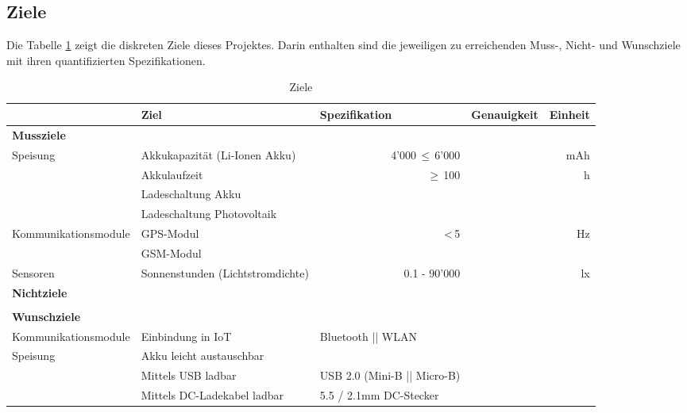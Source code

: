 \begin{landscape}
\subsection{Ziele}
Die Tabelle \ref{tab:ZieleP6} zeigt die diskreten Ziele dieses Projektes. Darin enthalten sind die jeweiligen zu erreichenden Muss-, Nicht- und Wunschziele mit ihren quantifizierten Spezifikationen.\\


\begin{table}[htbp]
  \centering
  \renewcommand{\arraystretch}{1.4}
  \caption{Ziele}
    \begin{tabular}{l|l|l|r|r}
          & \textbf{Ziel} & \multicolumn{1}{l|}{\textbf{Spezifikation}} & \multicolumn{1}{l|}{\textbf{Genauigkeit}} & \multicolumn{1}{l}{\textbf{Einheit}} \\
    \toprule
    \multicolumn{1}{l}{\textbf{Mussziele}} & \multicolumn{4}{r}{} \\
    \toprule
    \multirow{4}{*}{Speisung} & Akkukapazität (Li-Ionen Akku) & \multicolumn{1}{r|}{4'000\,$\leq$\,6'000} &  & mAh \\
\cline{2-5}           & Akkulaufzeit & \multicolumn{1}{r|}{$\geq$\,100} &   & h \\
\cline{2-5}          & Ladeschaltung Akku &       &       &  \\
\cline{2-5}           & Ladeschaltung Photovoltaik &       &       &  \\
    \hline
    \multirow{2}{*}{Kommunikationsmodule} & GPS-Modul   &  \multicolumn{1}{r|}{<\,5}  &       & Hz \\
\cline{2-5}          & GSM-Modul  &       &       &  \\
\hline
Sensoren & Sonnenstunden (Lichtstromdichte) & \multicolumn{1}{r|}{0.1 - 90'000} & & lx \\
    \bottomrule
    \multicolumn{1}{l}{\textbf{Nichtziele}} & \multicolumn{4}{r}{} \\
    \toprule
    & & & & \\
    \bottomrule
    \multicolumn{1}{l}{\textbf{Wunschziele}} & \multicolumn{4}{r}{} \\
    \toprule
    Kommunikationsmodule & Einbindung in IoT &       Bluetooth || WLAN &       &  \\
    \hline
    \multirow{3}{*}{Speisung} & Akku leicht austauschbar &       &       &  \\
\cline{2-5}  & Mittels USB ladbar & USB 2.0 (Mini-B || Micro-B) &       &  \\
\cline{2-5}  & Mittels DC-Ladekabel ladbar &      5.5 / 2.1mm DC-Stecker &       &  \\
    \bottomrule
    \end{tabular}%
  \label{tab:ZieleP6}%
\end{table}%


\end{landscape}

